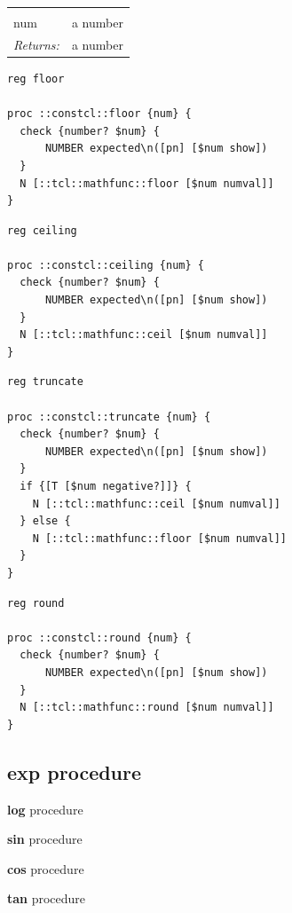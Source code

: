 \documentclass[twoside]{report}
\begin{document}
\noindent\begin{tabular}{ |p{1.9cm} p{8cm}| }
\hline
\rowcolor[HTML]{CCCCCC} \multicolumn{2}{|l|}{\bf floor, ceiling, truncate, round (public)} \\
num & a number \\
\textit{Returns:} & a number \\
\hline
\end{tabular}

\begin{lstlisting}
reg floor

proc ::constcl::floor {num} {
  check {number? $num} {
      NUMBER expected\n([pn] [$num show])
  }
  N [::tcl::mathfunc::floor [$num numval]]
}
\end{lstlisting}

\begin{lstlisting}
reg ceiling

proc ::constcl::ceiling {num} {
  check {number? $num} {
      NUMBER expected\n([pn] [$num show])
  }
  N [::tcl::mathfunc::ceil [$num numval]]
}
\end{lstlisting}

\begin{lstlisting}
reg truncate

proc ::constcl::truncate {num} {
  check {number? $num} {
      NUMBER expected\n([pn] [$num show])
  }
  if {[T [$num negative?]]} {
    N [::tcl::mathfunc::ceil [$num numval]]
  } else {
    N [::tcl::mathfunc::floor [$num numval]]
  }
}
\end{lstlisting}

\begin{lstlisting}
reg round

proc ::constcl::round {num} {
  check {number? $num} {
      NUMBER expected\n([pn] [$num show])
  }
  N [::tcl::mathfunc::round [$num numval]]
}
\end{lstlisting}

\subsection{exp procedure}
\label{exp-procedure}

\noindent \textbf{log} procedure

\noindent \textbf{sin} procedure

\noindent \textbf{cos} procedure

\noindent \textbf{tan} procedure
\end{document}
